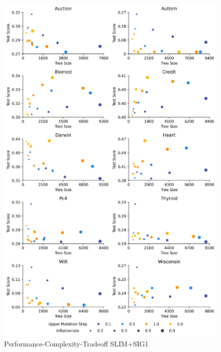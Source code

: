 
    \begin{figure}[H]
    \centering
    \includegraphics[width=\linewidth]{../Latex/Chapters/Figures/Results/RQ_Inflationrate_performance_complexity_tradeoff_plussig1.png}
    \caption{Performance-Complexity-Tradeoff SLIM+SIG1}
    \label{fig:RQ_Inflationrate_performance_complexity_tradeoff_plussig1}
    \end{figure}
    